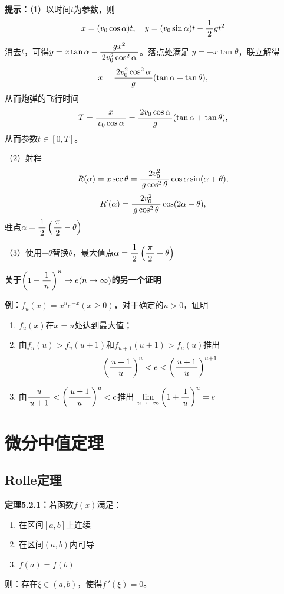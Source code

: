 {\bf 提示：}（1）以时间$t$为参数，则
$$x=(v_0\cos\alpha)t,\quad y=(v_0\sin\alpha)t-\displaystyle\frac{\,{1}\,}{\,{2}\,}gt^2$$
消去$t$，可得$y=x\tan\alpha-\displaystyle\frac{\,{gx^2}\,}{\,{2v_0^2\cos^2\alpha}\,}$。落点处满足
$y=-x\tan\theta$，联立解得
$$x=\displaystyle\frac{\,{2v_0^2\cos^2\alpha}\,}{\,{g}\,}(\tan\alpha+\tan\theta),$$
从而炮弹的飞行时间
$$T=\displaystyle\frac{\,{x}\,}{\,{v_0\cos\alpha}\,}=\displaystyle\frac{\,{2v_0\cos\alpha}\,}{\,{g}\,}(\tan\alpha+\tan\theta),$$
从而参数$t\in[0,T]$。

（2）射程
$$R(\alpha)=x\sec\theta=\displaystyle\frac{\,{2v_0^2}\,}{\,{g\cos^2\theta}\,}\cos\alpha\sin(\alpha+\theta),$$
$$R'(\alpha)=\displaystyle\frac{\,{2v_0^2}\,}{\,{g\cos^2\theta}\,}\cos(2\alpha+\theta),$$
驻点$\alpha=\displaystyle\frac{\,{1}\,}{\,{2}\,}\left(\displaystyle\frac{\,{\pi}\,}{\,{2}\,}-\theta\right)$

（3）使用$-\theta$替换$\theta$，最大值点$\alpha=\displaystyle\frac{\,{1}\,}{\,{2}\,}\left(\displaystyle\frac{\,{\pi}\,}{\,{2}\,}+\theta\right)$

\begin{shaded}

{\bf 关于$\left(1+\displaystyle\frac{\,{1}\,}{\,{n}\,}\right)^n\to e(n\to\infty)$的另一个证明}

{\bf 例：}$f_u(x)=x^ue^{-x}(x\geq0)$，对于确定的$u>0$，证明
\begin{enumerate}[(1)]
  \setlength{\itemindent}{1cm}
  \item $f_u(x)$在$x=u$处达到最大值；
  \item 由$f_u(u)>f_u(u+1)$和$f_{u+1}(u+1)>f_u(u)$推出
  $$\left(\displaystyle\frac{\,{u+1}\,}{\,{u}\,}\right)^u<e<\left(\displaystyle\frac{\,{u+1}\,}{\,{u}\,}\right)^{u+1}$$
  \item 由$\displaystyle\frac{\,{u}\,}{\,{u+1}\,}<\left(\displaystyle\frac{\,{u+1}\,}{\,{u}\,}\right)^u<e$推出
  $\lim\limits_{u\to+\infty}\left(1+\displaystyle\frac{\,{1}\,}{\,{u}\,}\right)^u=e$
\end{enumerate}

\end{shaded}

\section{微分中值定理}

\subsection{Rolle定理}

{\bf 定理5.2.1：}若函数$f(x)$满足：
\begin{enumerate}[(1)]
  \setlength{\itemindent}{1cm}
  \item 在区间$[a,b]$上连续
  \item 在区间$(a,b)$内可导
  \item $f(a)=f(b)$
\end{enumerate}
则：存在$\xi\in(a,b)$，使得$f\,'(\xi)=0$。

